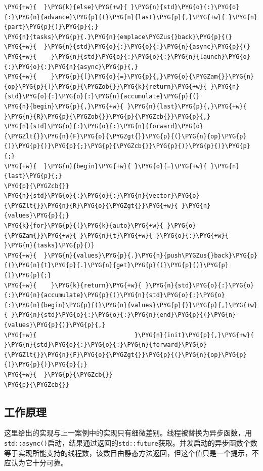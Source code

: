 \begin{codeblockbg}
\begin{Verbatim}[commandchars=\\\{\},breaklines=true,breakanywhere=true,fontsize=\codefont,xleftmargin=17bp]
\PYG{+w}{  }\PYG{k}{else}\PYG{+w}{ }\PYG{n}{std}\PYG{o}{:}\PYG{o}{:}\PYG{n}{advance}\PYG{p}{(}\PYG{n}{last}\PYG{p}{,}\PYG{+w}{ }\PYG{n}{part}\PYG{p}{)}\PYG{p}{;}
\PYG{n}{tasks}\PYG{p}{.}\PYG{n}{emplace\PYGZus{}back}\PYG{p}{(}
\PYG{+w}{  }\PYG{n}{std}\PYG{o}{:}\PYG{o}{:}\PYG{n}{async}\PYG{p}{(}
\PYG{+w}{    }\PYG{n}{std}\PYG{o}{:}\PYG{o}{:}\PYG{n}{launch}\PYG{o}{:}\PYG{o}{:}\PYG{n}{async}\PYG{p}{,}
\PYG{+w}{    }\PYG{p}{[}\PYG{o}{=}\PYG{p}{,}\PYG{o}{\PYGZam{}}\PYG{n}{op}\PYG{p}{]}\PYG{p}{\PYGZob{}}\PYG{k}{return}\PYG{+w}{ }\PYG{n}{std}\PYG{o}{:}\PYG{o}{:}\PYG{n}{accumulate}\PYG{p}{(}
\PYG{n}{begin}\PYG{p}{,}\PYG{+w}{ }\PYG{n}{last}\PYG{p}{,}\PYG{+w}{ }\PYG{n}{R}\PYG{p}{\PYGZob{}}\PYG{p}{\PYGZcb{}}\PYG{p}{,}
\PYG{n}{std}\PYG{o}{:}\PYG{o}{:}\PYG{n}{forward}\PYG{o}{\PYGZlt{}}\PYG{n}{F}\PYG{o}{\PYGZgt{}}\PYG{p}{(}\PYG{n}{op}\PYG{p}{)}\PYG{p}{)}\PYG{p}{;}\PYG{p}{\PYGZcb{}}\PYG{p}{)}\PYG{p}{)}\PYG{p}{;}
\PYG{+w}{  }\PYG{n}{begin}\PYG{+w}{ }\PYG{o}{=}\PYG{+w}{ }\PYG{n}{last}\PYG{p}{;}
\PYG{p}{\PYGZcb{}}
\PYG{n}{std}\PYG{o}{:}\PYG{o}{:}\PYG{n}{vector}\PYG{o}{\PYGZlt{}}\PYG{n}{R}\PYG{o}{\PYGZgt{}}\PYG{+w}{ }\PYG{n}{values}\PYG{p}{;}
\PYG{k}{for}\PYG{p}{(}\PYG{k}{auto}\PYG{+w}{ }\PYG{o}{\PYGZam{}}\PYG{+w}{ }\PYG{n}{t}\PYG{+w}{ }\PYG{o}{:}\PYG{+w}{ }\PYG{n}{tasks}\PYG{p}{)}
\PYG{+w}{  }\PYG{n}{values}\PYG{p}{.}\PYG{n}{push\PYGZus{}back}\PYG{p}{(}\PYG{n}{t}\PYG{p}{.}\PYG{n}{get}\PYG{p}{(}\PYG{p}{)}\PYG{p}{)}\PYG{p}{;}
\PYG{+w}{    }\PYG{k}{return}\PYG{+w}{ }\PYG{n}{std}\PYG{o}{:}\PYG{o}{:}\PYG{n}{accumulate}\PYG{p}{(}\PYG{n}{std}\PYG{o}{:}\PYG{o}{:}\PYG{n}{begin}\PYG{p}{(}\PYG{n}{values}\PYG{p}{)}\PYG{p}{,}\PYG{+w}{ }\PYG{n}{std}\PYG{o}{:}\PYG{o}{:}\PYG{n}{end}\PYG{p}{(}\PYG{n}{values}\PYG{p}{)}\PYG{p}{,}
\PYG{+w}{                           }\PYG{n}{init}\PYG{p}{,}\PYG{+w}{ }\PYG{n}{std}\PYG{o}{:}\PYG{o}{:}\PYG{n}{forward}\PYG{o}{\PYGZlt{}}\PYG{n}{F}\PYG{o}{\PYGZgt{}}\PYG{p}{(}\PYG{n}{op}\PYG{p}{)}\PYG{p}{)}\PYG{p}{;}
\PYG{+w}{  }\PYG{p}{\PYGZcb{}}
\PYG{p}{\PYGZcb{}}
\end{Verbatim}
\end{codeblockbg}



\subsection{工作原理}



这里给出的实现与上一案例中的实现只有细微差别。线程被替换为异步函数，用\texttt{std::\allowbreak{}async()}启动，结果通过返回的\texttt{std::\allowbreak{}future}获取。并发启动的异步函数个数等于实现所能支持的线程数，该数目由静态方法返回，但这个值只是一个提示，不应认为它十分可靠。


